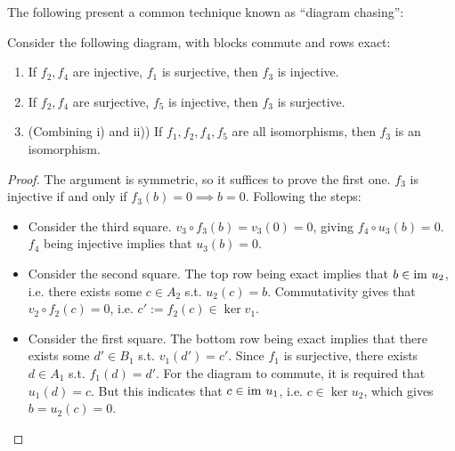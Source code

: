 \documentclass{article}
\begin{document}
The following present a common technique known as ``diagram chasing'':

\begin{proposition}
    Consider the following diagram, with blocks commute and rows exact:
    \begin{figure}[htbp]
        \centering
    \end{figure}
    \begin{enumerate}
        \item If $f_2, f_4$ are injective, $f_1$ is surjective, then $f_3$ is injective.
        \item If $f_2, f_4$ are surjective, $f_5$ is injective, then $f_3$ is surjective.
        \item (Combining i) and ii)) If $f_1, f_2, f_4, f_5$ are all isomorphisms, then $f_3$ is an isomorphism.
    \end{enumerate}
\end{proposition}

\begin{proof}
    The argument is symmetric, so it suffices to prove the first one. $f_3$ is injective if and only if $f_3(b) = 0 \implies b = 0$. Following the steps:
    \begin{itemize}
        \item Consider the third square. $v_3 \circ f_3(b) = v_3(0) = 0$, giving $f_4 \circ u_3(b) = 0$. $f_4$ being injective implies that $u_3(b) = 0$. 
        \item Consider the second square. The top row being exact implies that $b \in \mathrm{im}\  u_2$, i.e. there exists some $c \in A_2$ s.t. $u_2(c) = b$. Commutativity gives that $v_2 \circ f_2(c) = 0$, i.e. $c' := f_2(c) \in \ker v_1$.
        \item Consider the first square. The bottom row being exact implies that there exists some $d' \in B_1$ s.t. $v_1(d') = c'$. Since $f_1$ is surjective, there exists $d \in A_1$ s.t. $f_1(d) = d'$. For the diagram to commute, it is required that $u_1(d) = c$. But this indicates that $c \in \mathrm{im}\  u_1$, i.e. $c \in \ker u_2$, which gives $b = u_2(c) = 0$.
    \end{itemize}
\end{proof}
\end{document}
